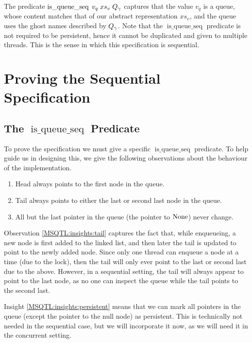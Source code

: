 \documentclass[twoside,11pt,openright]{report}
\newcommand{\isqueueseq}{\operatorname{is\_queue\_seq}}
\begin{document}
The predicate $\isqueueseq \; v_q \; xs_v \; Q_\gname$ captures that the value $v_q$ is a queue, whose content matches that of our abstract representation $xs_v$, and the queue uses the ghost names described by $Q_\gamma$. Note that the $\isqueueseq$ predicate is not required to be persistent, hence it cannot be duplicated and given to multiple threads. This is the sense in which this specification is sequential.

\section{Proving the Sequential Specification}
\subsection[The isqueueseq predicate]{The $\isqueueseq$ Predicate}
To prove the specification we must give a specific $\isqueueseq$ predicate. To help guide us in designing this, we give the following observations about the behaviour of the implementation.
\begin{enumerate}
  \item\label{MSQTL:insights:head} Head always points to the first node in the queue.
  \item\label{MSQTL:insights:tail} Tail always points to either the last or second last node in the queue.
  \item\label{MSQTL:insights:persistent} All but the last pointer in the queue (the pointer to $\operatorname{None}$) never change.
\end{enumerate}

Observation \ref{MSQTL:insights:tail} captures the fact that, while enqueueing, a new node is first added to the linked list, and then later the tail is updated to point to the newly added node. Since only one thread can enqueue a node at a time (due to the lock), then the tail will only ever point to the last or second last due to the above. However, in a sequential setting, the tail will always appear to point to the last node, as no one can inspect the queue while the tail points to the second last.

Insight \ref{MSQTL:insights:persistent} means that we can mark all pointers in the queue (except the pointer to the null node) as persistent. This is technically not needed in the sequential case, but we will incorporate it now, as we will need it in the concurrent setting.
\end{document}
